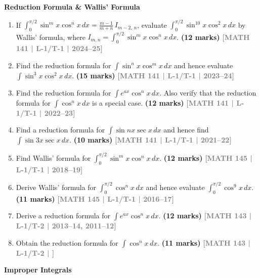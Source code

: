 \documentclass[12pt,a3paper]{article}
\newcommand{\yr}[1]{\hfill\textcolor{gray}{\small\textbf{[#1]}}}
\newcommand{\mk}[1]{\textcolor{orange!70!black}{\small\textbf{(#1 marks)}}}
\newcommand{\subtopic}[2]{%
  \vspace{10pt}
  \noindent\begin{tcolorbox}[colback=#1!8,colframe=#1,boxrule=0.6pt,arc=4pt,
    left=6pt,right=6pt,top=4pt,bottom=4pt]
    \small\bfseries\textcolor{#1}{#2}
  \end{tcolorbox}
  \vspace{2pt}
}
\begin{document}
\subtopic{cB}{Reduction Formula \& Wallis' Formula}
\label{sub:s2-rwallis}

\begin{enumerate}

\item If $\displaystyle\int_{0}^{\pi/2}\sin^{m}x\cos^{n}x\,dx =\frac{m-1}{m+n}\,I_{m-2,\,n}$, evaluate
$\int_{0}^{\pi/2}\sin^{10}x\cos^{2}x\,dx$
by Wallis' formula, where $I_{m,n}=\displaystyle\int_{0}^{\pi/2}\sin^{m}x\cos^{n}x\,dx$.
\mk{12} \yr{MATH 141 | L-1/T-1 | 2024--25}

\item Find the reduction formula for $\displaystyle\int\sin^{n}x\cos^{m}x\,dx$ and hence evaluate $\displaystyle\int\sin^{3}x\cos^{2}x\,dx$.
\mk{15} \yr{MATH 141 | L-1/T-1 | 2023--24}

\item Find the reduction formula for $\displaystyle\int e^{ax}\cos^{n}x\,dx$. Also verify that the reduction formula for $\displaystyle\int\cos^{n}x\,dx$ is a special case.
\mk{12} \yr{MATH 141 | L-1/T-1 | 2022--23}

\item Find a reduction formula for $\displaystyle\int\sin{n}x\sec x\,dx$ and hence find $\displaystyle\int\sin{3}x\sec x\,dx$.
\mk{10} \yr{MATH 141 | L-1/T-1 | 2021--22}
  
\item Find Wallis' formula for $\displaystyle\int_{0}^{\pi/2}\sin^{m}x\cos^{n}x\,dx$.
\mk{12} \yr{MATH 145 | L-1/T-1 | 2018--19}

  \item Derive Wallis' formula for $\displaystyle\int_{0}^{\pi/2}\cos^{n}x\,dx$ and hence evaluate $\displaystyle\int_{0}^{\pi/2}\cos^{9}x\,dx$.
\mk{11} \yr{MATH 145 | L-1/T-1 | 2016--17}

  \item Derive a reduction formula for $\displaystyle\int e^{ax}\cos^{n}x\,dx$.
\mk{12} \yr{MATH 143 | L-1/T-2 | 2013--14, 2011--12}

  \item Obtain the reduction formula for $\displaystyle\int \cos^{n}x\,dx$.
\mk{11} \yr{MATH 143 | L-1/T-2 | }

\end{enumerate}

\subtopic{cB}{Improper Integrals}
\label{sub:s2-improper}
\end{document}
